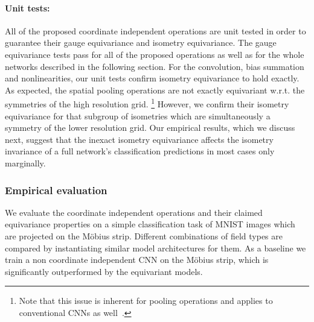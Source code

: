 \paragraph{Unit tests:}
All of the proposed coordinate independent operations are unit tested in order to guarantee their gauge equivariance and isometry equivariance.
The gauge equivariance tests pass for all of the proposed operations as well as for the whole networks described in the following section.
For the convolution, bias summation and nonlinearities, our unit tests confirm isometry equivariance to hold exactly.
As expected, the spatial pooling operations are not exactly equivariant w.r.t. the symmetries of the high resolution grid.%
\footnote{
    Note that this issue is inherent for pooling operations and applies to conventional CNNs as well~\cite{azulay2018shift,zhang2019CNNsShiftInvariant}.
}
However, we confirm their isometry equivariance for that subgroup of isometries which are simultaneously a symmetry of the lower resolution grid.
Our empirical results, which we discuss next, suggest that the inexact isometry equivariance affects the isometry invariance of a full network's classification predictions in most cases only marginally.








\subsubsection{Empirical evaluation}
\label{sec:mobius_evaluation}

We evaluate the coordinate independent operations and their claimed equivariance properties on a simple classification task of MNIST images which are projected on the M\"obius strip.
Different combinations of field types are compared by instantiating similar model architectures for them.
As a baseline we train a non coordinate independent CNN on the M\"obius strip, which is significantly outperformed by the equivariant models.

